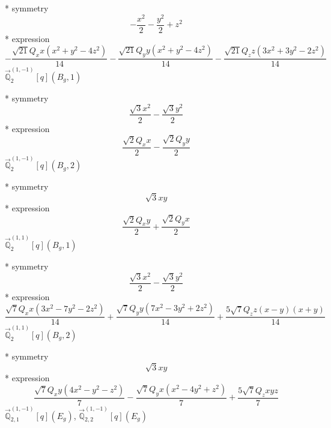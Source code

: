 \documentclass[fleqn,8pt]{jsarticle}
\begin{document}
\noindent\quad ** symmetry
\begin{dmath*}
- \frac{x^{2}}{2} - \frac{y^{2}}{2} + z^{2}
\end{dmath*}
\noindent\quad ** expression
\begin{dmath*}
- \frac{\sqrt{21} Q_{x} x \left(x^{2} + y^{2} - 4 z^{2}\right)}{14} - \frac{\sqrt{21} Q_{y} y \left(x^{2} + y^{2} - 4 z^{2}\right)}{14} - \frac{\sqrt{21} Q_{z} z \left(3 x^{2} + 3 y^{2} - 2 z^{2}\right)}{14}
\end{dmath*}
\noindent\quad $\vec{\mathbb{Q}}_{2}^{(1,-1)}[q](B_{g},1)$

\noindent\quad ** symmetry
\begin{dmath*}
\frac{\sqrt{3} x^{2}}{2} - \frac{\sqrt{3} y^{2}}{2}
\end{dmath*}
\noindent\quad ** expression
\begin{dmath*}
\frac{\sqrt{2} Q_{x} x}{2} - \frac{\sqrt{2} Q_{y} y}{2}
\end{dmath*}
\noindent\quad $\vec{\mathbb{Q}}_{2}^{(1,-1)}[q](B_{g},2)$

\noindent\quad ** symmetry
\begin{dmath*}
\sqrt{3} x y
\end{dmath*}
\noindent\quad ** expression
\begin{dmath*}
\frac{\sqrt{2} Q_{x} y}{2} + \frac{\sqrt{2} Q_{y} x}{2}
\end{dmath*}
\noindent\quad $\vec{\mathbb{Q}}_{2}^{(1,1)}[q](B_{g},1)$

\noindent\quad ** symmetry
\begin{dmath*}
\frac{\sqrt{3} x^{2}}{2} - \frac{\sqrt{3} y^{2}}{2}
\end{dmath*}
\noindent\quad ** expression
\begin{dmath*}
\frac{\sqrt{7} Q_{x} x \left(3 x^{2} - 7 y^{2} - 2 z^{2}\right)}{14} + \frac{\sqrt{7} Q_{y} y \left(7 x^{2} - 3 y^{2} + 2 z^{2}\right)}{14} + \frac{5 \sqrt{7} Q_{z} z \left(x - y\right) \left(x + y\right)}{14}
\end{dmath*}
\noindent\quad $\vec{\mathbb{Q}}_{2}^{(1,1)}[q](B_{g},2)$

\noindent\quad ** symmetry
\begin{dmath*}
\sqrt{3} x y
\end{dmath*}
\noindent\quad ** expression
\begin{dmath*}
\frac{\sqrt{7} Q_{x} y \left(4 x^{2} - y^{2} - z^{2}\right)}{7} - \frac{\sqrt{7} Q_{y} x \left(x^{2} - 4 y^{2} + z^{2}\right)}{7} + \frac{5 \sqrt{7} Q_{z} x y z}{7}
\end{dmath*}
\noindent\quad $\vec{\mathbb{Q}}_{2,1}^{(1,-1)}[q](E_{g})$, $\vec{\mathbb{Q}}_{2,2}^{(1,-1)}[q](E_{g})$
\end{document}
